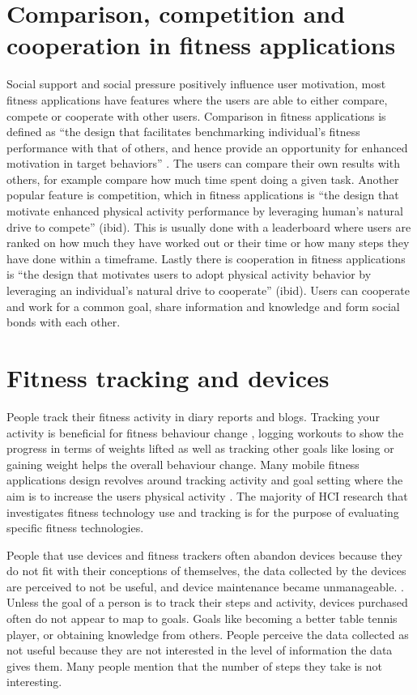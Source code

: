 \section{Comparison, competition and cooperation in fitness applications}
 Social support and social pressure positively influence user motivation\cite{Buis2009}, most fitness applications have features where the users are able to either compare, compete or cooperate with other users. Comparison in fitness applications is defined as “the design that facilitates benchmarking individual’s fitness performance with that of others, and hence provide an opportunity for enhanced motivation in target behaviors” \cite{Yoganathan2013}. The users can compare their own results with others, for example compare how much time spent doing a given task. Another popular feature is competition, which in fitness applications is “the design that motivate enhanced physical activity performance by leveraging human’s natural drive to compete” (ibid). This is usually done with a leaderboard where users are ranked on how much they have worked out or their time or how many steps they have done within a timeframe.  Lastly there is cooperation in fitness applications is “the design that motivates users to adopt physical activity behavior by leveraging an individual’s natural drive to cooperate” (ibid). Users can cooperate and work for a common goal, share information and knowledge and form social bonds with each other.

 

\section{Fitness tracking and devices}
People track their fitness activity in diary reports and blogs.\cite{Goodman} Tracking your activity is beneficial for fitness behaviour change \cite{mccormick2015psychological}, logging workouts to show the progress in terms of weights lifted as well as tracking other goals like losing or gaining weight helps the overall behaviour change. Many mobile fitness applications design revolves around tracking activity and goal setting where the aim is to increase the users physical activity \cite{consolvo2007conducting}. 
The majority of HCI research that investigates fitness
technology use and tracking is for the purpose of evaluating specific fitness technologies\cite{Patel2015}. 

People that use devices and fitness trackers often abandon devices because they do not fit with their conceptions of themselves, the data collected by the devices are perceived to not be useful, and device maintenance became unmanageable. \cite{Lazar2015}. Unless the goal of a person is to track their steps and activity, devices purchased often do not appear to map to goals\cite{Lazar2015}. Goals like becoming a better table tennis player, or obtaining knowledge from others. People perceive the data collected as not useful because they are not interested in the level of information the data gives them. Many people mention that the number of steps they take is not interesting\cite{Lazar2015}. 

